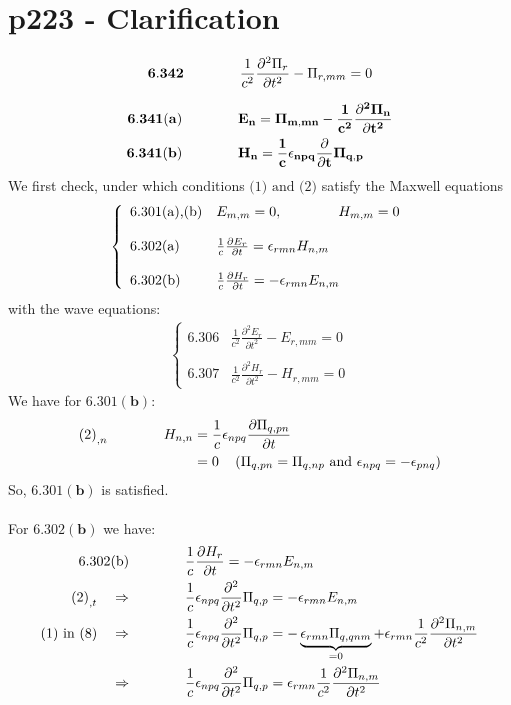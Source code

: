 \section{p223 - Clarification}
\begin{tcolorbox}
 $$\mathbf{6.342}\quad\quad\quad\quad \frac{1}{c^2}\frac{\partial^2 \Pi_r}{\partial t^2}- \Pi_{r,mm}=0$$
\end{tcolorbox}
\begin{align}
\mathbf{6.341(a)} \quad\quad\quad\quad &\mathbf{E_n= \Pi_{m,mn}-\frac{1}{c^2}\frac{\partial^2 \Pi_n}{\partial t^2}}\\
\mathbf{6.341(b)} \quad\quad\quad\quad &\mathbf{H_n= \frac{1}{c}\epsilon_{npq}\frac{\partial}{\partial t}\Pi_{q,p}}
\end{align}
We first check, under which conditions $\text{(1) and (2)}$ satisfy the Maxwell equations 
\begin{align}\left\{ \begin{array}{ll}
\text{6.301(a),(b)}&E_{m,m}=0,\quad\quad\quad\quad H_{m,m}=0\\\\
\text{6.302(a)}&\frac{1}{c}\frac{\partial E_r}{\partial t}= \epsilon_{rmn}H_{n,m}\\\\
\text{6.302(b)}&\frac{1}{c}\frac{\partial H_r}{\partial t}= -\epsilon_{rmn}E_{n,m}
\end{array}\right.
\end{align}
with the wave equations: 
\begin{align}\left\{ \begin{array}{ll}
\text{6.306}&\frac{1}{c^2}\frac{\partial^2 E_r}{\partial t^2}- E_{r,mm}=0\\\\
\text{6.307}&\frac{1}{c^2}\frac{\partial^2 H_r}{\partial t^2}- H_{r,mm}=0
\end{array}\right.
\end{align}
We have for $\mathbf{6.301(b)}$:
\begin{align}
\text{(2)}_{,n}\quad\quad\quad\quad H_{n,n} &= \frac{1}{c}\epsilon_{npq}\frac{\partial \Pi_{q,pn}}{\partial t}\\&= 0 \quad \left(  \Pi_{q,pn}=\Pi_{q,np } \text{ and }\epsilon_{npq}=-\epsilon_{pnq} \right)\end{align}
So, $\mathbf{6.301(b)}$ is satisfied.\\\\
For $\mathbf{6.302(b)}$ we have:
\begin{align}               
\text{6.302(b)}\quad\quad\quad\quad &\frac{1}{c}\frac{\partial H_r}{\partial t}= -\epsilon_{rmn}E_{n,m}\\
\text{(2)}_{,t}\quad \Rightarrow\quad\quad\quad\quad &\frac{1}{c}\epsilon_{npq}\frac{\partial^2}{\partial t^2}\Pi_{q,p}= -\epsilon_{rmn}E_{n,m}\\
\text{(1) in (8)}\quad \Rightarrow\quad\quad\quad\quad &\frac{1}{c}\epsilon_{npq}\frac{\partial^2}{\partial t^2}\Pi_{q,p}= -\underbrace{\epsilon_{rmn}\Pi_{q,qnm}}_{=0}+\epsilon_{rmn}\frac{1}{c^2}\frac{\partial^2 \Pi_{n,m}}{\partial t^2}\\
\Rightarrow\quad\quad\quad\quad &\frac{1}{c}\epsilon_{npq}\frac{\partial^2}{\partial t^2}\Pi_{q,p}= \epsilon_{rmn}\frac{1}{c^2}\frac{\partial^2 \Pi_{n,m}}{\partial t^2}
\end{align}
